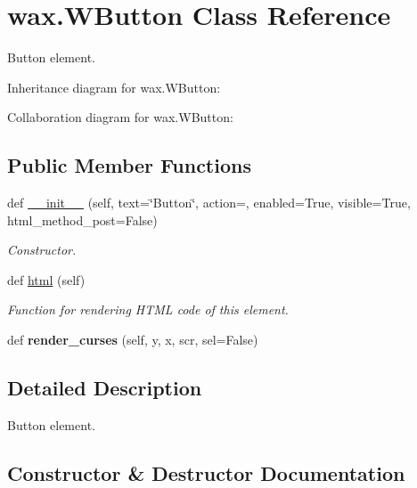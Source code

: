 \hypertarget{classwax_1_1WButton}{}\section{wax.\+W\+Button Class Reference}
\label{classwax_1_1WButton}


Button element.  




Inheritance diagram for wax.\+W\+Button\+:


Collaboration diagram for wax.\+W\+Button\+:
\subsection*{Public Member Functions}
\begin{DoxyCompactItemize}
\item 
def \hyperlink{classwax_1_1WButton_a307e253a01fc91d1b59149721d4dcb81}{\+\_\+\+\_\+init\+\_\+\+\_\+} (self, text=\char`\"{}Button\char`\"{}, action=\textquotesingle{}\textquotesingle{}, enabled=True, visible=True, html\+\_\+method\+\_\+post=False)
\begin{DoxyCompactList}\small\item\em Constructor. \end{DoxyCompactList}\item 
def \hyperlink{classwax_1_1WButton_a0ab72382e1d27554b7bd80cd88f7f45b}{html} (self)
\begin{DoxyCompactList}\small\item\em Function for rendering H\+T\+ML code of this element. \end{DoxyCompactList}\item 
def {\bfseries render\+\_\+curses} (self, y, x, scr, sel=False)\hypertarget{classwax_1_1WButton_a7cfea243851636f295c265e44ffc63bd}{}\label{classwax_1_1WButton_a7cfea243851636f295c265e44ffc63bd}

\end{DoxyCompactItemize}


\subsection{Detailed Description}
Button element. 

\subsection{Constructor \& Destructor Documentation}
